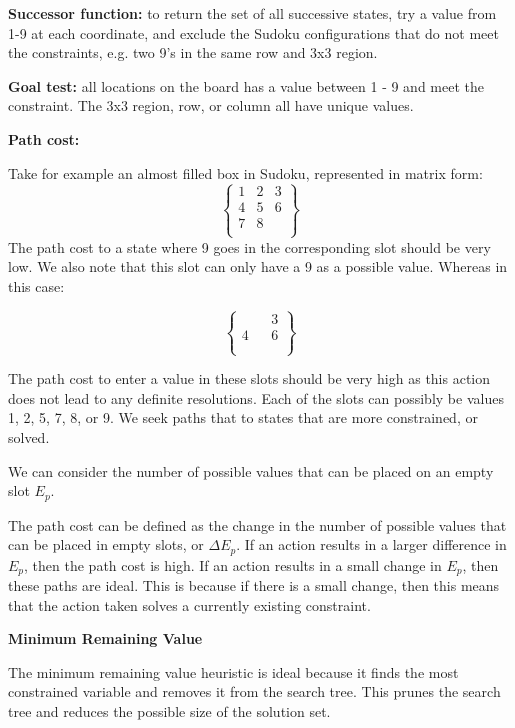 \textbf{Successor function:} to return the set of all successive states, try a value from 1-9 at each coordinate, and exclude the Sudoku configurations that do not meet the constraints, e.g. two 9's in the same row and 3x3 region.

\textbf{Goal test:} all locations on the board has a value between 1 - 9 and meet the constraint. The 3x3 region, row, or column all have unique values. 

\textbf{Path cost:} 

Take for example an almost filled box in Sudoku, represented in matrix form:
\[
\begin{Bmatrix}
	1 & 2 & 3 \\
	4 & 5 & 6 \\
	7 & 8 &  \\	
\end{Bmatrix}
\]
The path cost to a state where 9 goes in the corresponding slot should be very low. We also note that this slot can only have a 9 as a possible value. Whereas in this case:

\[
\begin{Bmatrix}
 &  & 3 \\
4 &  & 6 \\
 &  &  \\	
\end{Bmatrix}
\]

The path cost to enter a value in these slots should be very high as this action does not lead to any definite resolutions. Each of the slots can possibly be values 1, 2, 5, 7, 8, or 9. We seek paths that to states that are more constrained, or solved.

We can consider the number of possible values that can be placed on an empty slot $E_p$.

The path cost can be defined as the change in the number of possible values that can be placed in empty slots, or $\Delta E_p$. If an action results in a larger difference in $E_p$, then the path cost is high. If an action results in a small change in $E_p$, then these paths are ideal. This is because if there is a small change, then this means that the action taken solves a currently existing constraint.


\textbf{Minimum Remaining Value}

The minimum remaining value heuristic is ideal because it finds the most constrained variable and removes it from the search tree. This prunes the search tree and reduces the possible size of the solution set.


